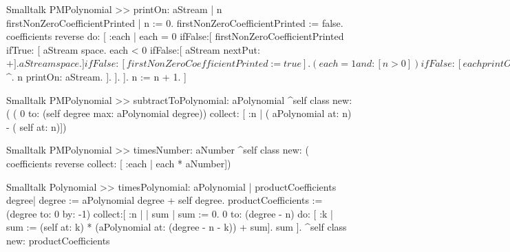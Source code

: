 \begin{displaycode}{Smalltalk}
PMPolynomial >> printOn: aStream
    | n firstNonZeroCoefficientPrinted |
    n := 0.
    firstNonZeroCoefficientPrinted := false.
    coefficients reverse do:
        [ :each |
          each = 0
            ifFalse:[ firstNonZeroCoefficientPrinted
                            ifTrue: [ aStream space.
                                         each < 0
                                            ifFalse:[ aStream 
                                                         nextPut: $+].
                                         aStream space.
                                        ]
                            ifFalse:[ firstNonZeroCoefficientPrinted 
                                                             := true].
                          ( each = 1 and: [ n > 0])
                            ifFalse:[ each printOn: aStream].
                          n > 0
                            ifTrue: [ aStream nextPutAll: ' X'.
                                         n > 1
                                            ifTrue: [ aStream 
                                                          nextPut: $^.
                                                         n printOn: 
                                                              aStream.
                                                        ].
                                        ].
                        ].
         n := n + 1.
        ]
\end{displaycode}

\begin{displaycode}{Smalltalk}
PMPolynomial >> subtractToPolynomial: aPolynomial
    ^self class new: ( ( 0 to: (self degree max: aPolynomial degree)) 
                collect: [ :n | ( aPolynomial at: n) - ( self at: n)])
\end{displaycode}

\begin{displaycode}{Smalltalk}
PMPolynomial >> timesNumber: aNumber
    ^self class new: ( coefficients reverse collect: [ :each | each * aNumber])
\end{displaycode}

\begin{displaycode}{Smalltalk}
Polynomial >> timesPolynomial: aPolynomial
    | productCoefficients degree|
    degree := aPolynomial degree + self degree.
    productCoefficients := (degree to: 0 by: -1)
            collect:[ :n | | sum |
                      sum := 0.
                      0 to: (degree - n)
                        do: [ :k | sum := (self at: k) * (aPolynomial 
                                        at: (degree - n - k)) + sum].
                      sum
                    ].
    ^self class new: productCoefficients
\end{displaycode}

